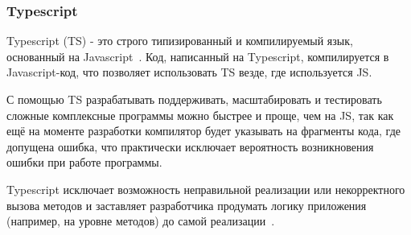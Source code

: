 \subsubsection{Typescript}

Typescript (TS) - это строго типизированный и компилируемый язык, основанный на Javascript~\cite{TS}. Код, написанный на Typescript, компилируется в Javascript-код, что позволяет использовать TS везде, где используется JS.

С помощью TS разрабатывать поддерживать, масштабировать и тестировать сложные комплексные программы можно быстрее и проще, чем на JS, так как ещё на моменте разработки компилятор будет указывать на фрагменты кода, где допущена ошибка, что практически исключает вероятность возникновения ошибки при работе программы.

Typescript исключает возможность неправильной реализации или некорректного вызова методов и заставляет разработчика продумать логику приложения (например, на уровне методов) до самой реализации~\cite{TS}.
